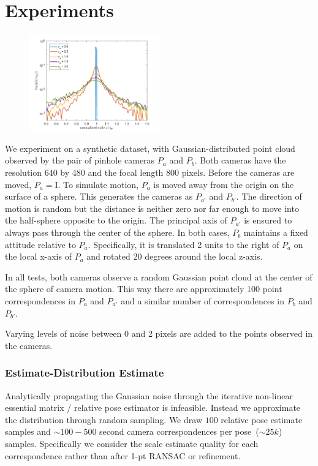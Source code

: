 \section{Experiments}
\begin{figure}[t]
	\centering
	\includegraphics[width=0.5\textwidth]{images/scale_prob_est_e.pdf}
	\caption{}
	\label{experiments:fig:distribution}
\end{figure}
We experiment on a synthetic dataset, with Gaussian-distributed point cloud observed by the pair of pinhole cameras $P_a$ and $P_b$. Both cameras have the resolution 640 by 480 and the focal length 800 pixels. 
Before the cameras are moved, $P_a = \mathrm{I}$. To simulate motion, $P_a$ is moved away from the origin on the surface of a sphere. This generates the cameras as $P_{a'}$ and $P_{b'}$. The direction of motion is random but the distance is neither zero nor far enough to move into the half-sphere opposite to the origin. The principal axis of $P_{a'}$ is ensured to always pass through the center of the sphere. In both cases, $P_b$ maintains a fixed attitude relative to $P_a$. Specifically, it is translated 2 units to the right of $P_a$ on the local x-axis of $P_a$ and rotated 20 degrees around the local z-axis. 

In all tests, both cameras observe a random Gaussian point cloud at the center of the sphere of camera motion. This way there are approximately 100 point correspondences in $P_a$ and $P_{a'}$ and a similar number of correspondences in $P_b$ and $P_{b'}$.

Varying levels of noise between 0 and 2 pixels are added to the points observed in the cameras.  

\subsubsection{Estimate-Distribution Estimate}
Analytically propagating the Gaussian noise through the iterative non-linear essential matrix / relative pose estimator is infeasible. Instead we approximate the distribution through random sampling. We draw $100$ relative pose estimate samples and $\sim 100-500$ second camera correspondences per pose~($\sim 25k$) samples. Specifically we consider the scale estimate quality for each correspondence rather than after 1-pt RANSAC or refinement. 

